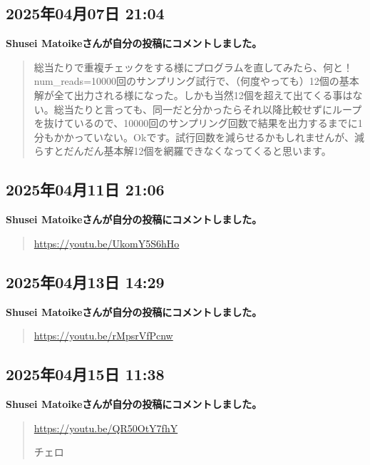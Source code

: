 \subsection*{2025年04月07日 21:04}

\textbf{Shusei Matoikeさんが自分の投稿にコメントしました。}

\begin{quote}
総当たりで重複チェックをする様にプログラムを直してみたら、何と！num\_reads=10000回のサンプリング試行で、（何度やっても）12個の基本解が全て出力される様になった。しかも当然12個を超えて出てくる事はない。総当たりと言っても、同一だと分かったらそれ以降比較せずにループを抜けているので、10000回のサンプリング回数で結果を出力するまでに1分もかかっていない。Okです。試行回数を減らせるかもしれませんが、減らすとだんだん基本解12個を網羅できなくなってくると思います。
\end{quote}

\subsection*{2025年04月11日 21:06}

\textbf{Shusei Matoikeさんが自分の投稿にコメントしました。}

\begin{quote}
\url{https://youtu.be/UkomY5S6hHo}
\end{quote}

\subsection*{2025年04月13日 14:29}

\textbf{Shusei Matoikeさんが自分の投稿にコメントしました。}

\begin{quote}
\url{https://youtu.be/rMpsrVfPcnw}
\end{quote}

\subsection*{2025年04月15日 11:38}

\textbf{Shusei Matoikeさんが自分の投稿にコメントしました。}

\begin{quote}
\url{https://youtu.be/QR50OtY7fhY}

チェロ
\end{quote}

